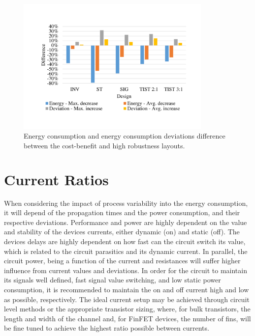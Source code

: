 \documentclass[diss,pgmicro,english]{iiufrgs}
\begin{document}
\begin{figure}[H]
	\centering
        \caption{Energy consumption and energy consumption deviations difference between the cost-benefit and high robustness layouts. \label{CBCompHR}}
      	\includegraphics[width=0.85\textwidth, trim={1.25cm 2cm 2cm 3cm}, clip]{compCB-HR.pdf}
\end{figure}


\section{Current Ratios}




    When considering the impact of process variability into the energy consumption, it will depend of the propagation times and the power consumption, and their respective deviations. Performance and power are highly dependent on the value and stability of the devices currents, either dynamic (on) and static (off). The devices delays are highly dependent on how fast can the circuit switch its value, which is related to the circuit parasitics and its dynamic current. In parallel, the circuit power, being a function of the current and resistances will suffer higher influence from current values and deviations. In order for the circuit to maintain its signals well defined, fast signal value switching, and low static power consumption, it is recommended to maintain the on and off current high and low as possible, respectively. The ideal current setup may be achieved through circuit level methods or the appropriate transistor sizing, where, for bulk transistors, the length and width of the channel and, for FinFET devices, the number of fins, will be fine tuned to achieve the highest ratio possible between currents.
\end{document}

